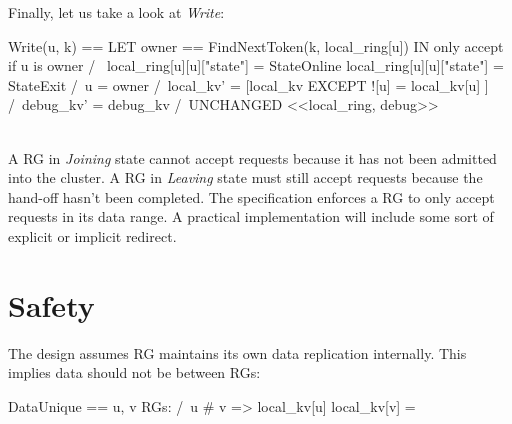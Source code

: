 Finally, let us take a look at \textit{Write}:\\
\begin{tla}
Write(u, k) == 
    LET 
        owner == FindNextToken(k, local_ring[u])
    IN 
        \* only accept if u is owner
        /\ \/ local_ring[u][u]["state"] = StateOnline
           \/ local_ring[u][u]["state"] = StateExit
        /\ u = owner
        /\ local_kv' = [local_kv EXCEPT ![u] 
                        = local_kv[u] ]
        /\ debug_kv' = debug_kv 
        /\ UNCHANGED <<local_ring, debug>>
\end{tla}
\begin{tlatex}
%
%
%
%
%
%
\@xx{}%
%
%
 \@x{\@s{32.8} \.{\land} local\_kv \.{'} \.{=} [ local\_kv {\EXCEPT} {\bang} [
 u ]}%
\@x{\@s{32.8} \.{=} local\_kv [ u ] \.{\cup} \{ k \} ]}%
%
\end{tlatex}
\\

A RG in \textit{Joining} state cannot accept requests because it has not been
admitted into the cluster. A RG in \textit{Leaving} state must still
accept requests because the hand-off hasn't been completed. The specification 
enforces a RG to only accept requests in its data range. A practical
implementation will include some sort of explicit or implicit redirect.

\section{Safety}

The design assumes RG maintains its own data replication internally. This implies 
data should not be between RGs:\\

\begin{tla}
DataUnique == 
    \A u, v \in RGs:
        /\ u # v => local_kv[u] \intersect local_kv[v] = {}
\end{tla}
\begin{tlatex}
%
%
\end{tlatex}

